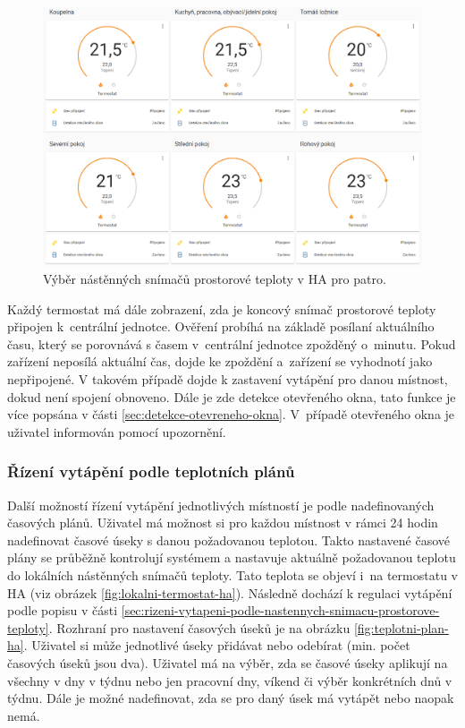 \begin{figure}[H]
    \centering
    \includegraphics[width=\textwidth]{images/software-ha/prehled-lokalnich-termostaty-patro.png}
    \caption{Výběr nástěnných snímačů prostorové teploty v HA pro patro.}
    \label{fig:prehled-lokalnich-termostaty-patro}
\end{figure}

Každý termostat má dále zobrazení, zda je koncový snímač prostorové teploty připojen k~centrální jednotce.  Ověření probíhá na základě posílaní aktuálního času, který se porovnává s časem v~centrální jednotce zpožděný o~minutu. Pokud zařízení neposílá aktuální čas, dojde ke zpoždění a~zařízení se vyhodnotí jako nepřipojené. V takovém případě dojde k zastavení vytápění pro danou místnost, dokud není spojení obnoveno. Dále je zde detekce otevřeného okna, tato funkce je více popsána v části \ref{sec:detekce-otevreneho-okna}. V~případě otevřeného okna je uživatel informován pomocí upozornění. 



\subsubsection{Řízení vytápění podle teplotních plánů} 
\label{sec:rizeni-vytapeni-podle-teplotnich-planu}
Další možností řízení vytápění jednotlivých místností je podle nadefinovaných časových plánů. Uživatel má možnost si pro každou místnost v rámci 24 hodin nadefinovat časové úseky s danou požadovanou teplotou. Takto nastavené časové plány se průběžně kontrolují systémem a nastavuje aktuálně požadovanou teplotu do lokálních nástěnných snímačů teploty. Tato teplota se objeví i~na termostatu v HA (viz obrázek \ref{fig:lokalni-termostat-ha}). Následně dochází k regulaci vytápění podle popisu v části \ref{sec:rizeni-vytapeni-podle-nastennych-snimacu-prostorove-teploty}. Rozhraní pro nastavení časových úseků je na obrázku \ref{fig:teplotni-plan-ha}. Uživatel si může jednotlivé úseky přidávat nebo odebírat (min. počet časových úseků jsou dva). Uživatel má na výběr, zda se časové úseky aplikují na všechny v dny v týdnu nebo jen pracovní dny, víkend či výběr konkrétních dnů v týdnu. Dále je možné nadefinovat, zda se pro daný úsek má vytápět nebo naopak nemá.

